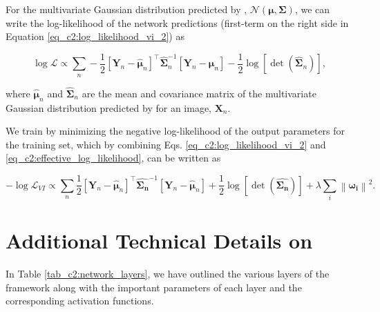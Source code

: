 For the multivariate Gaussian distribution predicted by \gampen{}, $\mathcal{N}(\boldsymbol{\mu}, \boldsymbol{\Sigma})$, we can write the log-likelihood of the network predictions (first-term on the right side in Equation \ref{eq_c2:log_likelihood_vi_2}) as 

\begin{equation}
\log \mathcal{L} \propto  \sum_{n}  -\frac{1}{2}\left[\boldsymbol{Y}_{n}-\boldsymbol{\hat{\mu}}_{n}\right]^{\top} \boldsymbol{\hat{\Sigma}}_n^{-1}\left[\boldsymbol{Y}_{n}-\boldsymbol{\hat{\mu}}_{n}\right] -\frac{1}{2} \log [\operatorname{det}(\boldsymbol{\hat{\Sigma}}_n)] ,
\label{eq_c2:effective_log_likelihood}
\end{equation}

\noindent
where $\boldsymbol{\hat{\mu}}_n$ and $\boldsymbol{\hat{\Sigma}}_n$ are the mean and covariance matrix of the multivariate Gaussian distribution predicted by \gampen{} for an image, $\boldsymbol{X}_n$. 

We train \gampen{} by minimizing the negative log-likelihood of the output parameters for the training set, which by combining Eqs. \ref{eq_c2:log_likelihood_vi_2} and \ref{eq_c2:effective_log_likelihood}, can be written as

\begin{equation}
- \log \mathcal{L}_{VI} \propto  \sum_{n} \frac{1}{2}\left[\boldsymbol{Y}_{n}-\boldsymbol{\hat{\mu}}_{n}\right]^{\top} \boldsymbol{\hat{\Sigma_n}}^{-1}\left[\boldsymbol{Y}_{n}-\boldsymbol{\hat{\mu}}_{n}\right] + \frac{1}{2} \log [\operatorname{det}(\boldsymbol{\hat{\Sigma_n}})] + \lambda \sum_{i}\left\|\boldsymbol{\omega_{i}}\right\|^{2} .
\label{eq_c2:ap:final_loss_fn}
\end{equation}

\section{Additional Technical Details on \gampen{}}

In Table \ref{tab_c2:network_layers}, we have outlined the various layers of the \gampen{} framework along with the important parameters of each layer and the corresponding activation functions.


